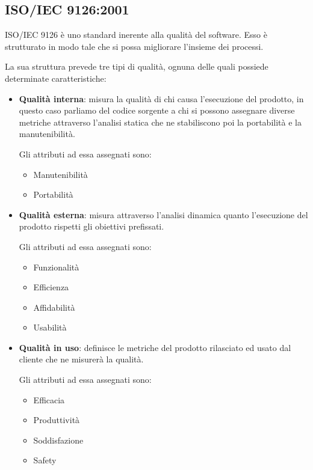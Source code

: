 	\subsection{ISO/IEC 9126:2001}
	ISO/IEC 9126 è uno standard inerente alla qualità del software. Esso è strutturato in modo tale che si possa migliorare l'insieme dei processi.
	
	La sua struttura prevede tre tipi di qualità, ognuna delle quali possiede determinate caratteristiche:
	
	\begin{itemize}
		\item \textbf{Qualità interna}: misura la qualità di chi causa l'esecuzione del prodotto, in questo caso parliamo del codice sorgente a chi si possono assegnare diverse metriche attraverso l'analisi statica che ne stabiliscono poi la portabilità e la manutenibilità.
		
		Gli attributi ad essa assegnati sono:
		
		\begin{itemize}
			\item Manutenibilità
			\item Portabilità
		\end{itemize}
	
		\item \textbf{Qualità esterna}: misura attraverso l'analisi dinamica quanto l'esecuzione del prodotto rispetti gli obiettivi prefissati.
		
		Gli attributi ad essa assegnati sono:
		
			\begin{itemize}
			\item Funzionalità
			\item Efficienza
			\item Affidabilità
			\item Usabilità
		\end{itemize}
	
		\item \textbf{Qualità in uso}: definisce le metriche del prodotto rilasciato ed usato dal cliente che ne misurerà la qualità.
		
		Gli attributi ad essa assegnati sono:
		
		\begin{itemize}
			\item Efficacia
			\item Produttività
			\item Soddisfazione
			\item Safety
		\end{itemize}
	\end{itemize}

